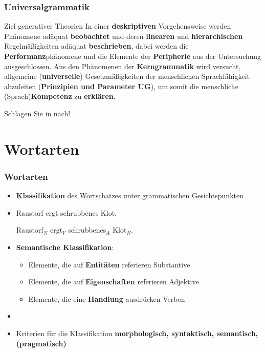 \begin{frame}
\frametitle{Universalgrammatik}

\begin{block}{Ziel generativer Theorien}
In einer \textbf{deskriptiven} Vorgehensweise werden Phänomene adäquat \textbf{beobachtet} und deren \textbf{linearen} und \textbf{hierarchischen} Regelmäßigkeiten adäquat \textbf{beschrieben}, dabei werden die \textbf{Performanz}phänomene und die Elemente der \textbf{Peripherie} aus der Untersuchung ausgeschlossen. Aus den Phänomenen der \textbf{Kerngrammatik} wird versucht, allgemeine (\textbf{universelle}) Gesetzmäßigkeiten der menschlichen Sprachfähigkeit abzuleiten (\textbf{Prinzipien und Parameter \ras UG}), um somit die menschliche (Sprach)\textbf{Kompetenz} zu \textbf{erklären}. \citep[vgl.][]{Fries16c}
\end{block}

Schlagen Sie  in \citet{Glueck&Roedel16a} nach!

\end{frame}


\section{Wortarten}


\begin{frame}
\frametitle{Wortarten}

\begin{itemize}
	\item \textbf{Klassifikation} des Wortschatzes unter grammatischen Gesichtspunkten 
	\item[]

\pause	

	\ea Raustorf ergt schrubbenes Klot.
	\z

\pause

	\ea Raustorf$_N$ ergt$_V$ schrubbenes$_A$ Klot$_N$.
	\z
	
\pause
	\item \textbf{Semantische Klassifikation}:
	\begin{itemize}
		\item Elemente, die auf \textbf{Entitäten} referieren \ras Substantive
		\item Elemente, die auf \textbf{Eigenschaften} referieren \ras Adjektive
		\item Elemente, die eine \textbf{Handlung} ausdrücken \ras Verben

	\end{itemize}

\pause
	\item[]
	\item Kriterien für die Klassifikation \ras \textbf{morphologisch, syntaktisch, semantisch, (pragmatisch)}
	
\end{itemize}

\end{frame}


